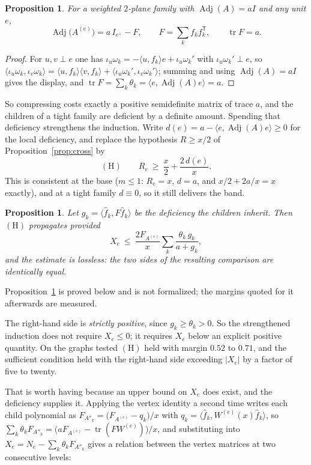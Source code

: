 \documentclass[11pt]{article}
\newtheorem{proposition}[theorem]{Proposition}
\theoremstyle{remark}
\begin{document}
\begin{proposition}\label{prop:deficient}
For a weighted $2$-plane family with $\operatorname{Adj}(A)=aI$ and any unit $e$,
\[
\operatorname{Adj}\bigl(A^{(e)}\bigr)=a\,I_{e^\perp}-F,\qquad F=\sum_kf_kf_k^{\mathsf T},
\qquad \operatorname{tr}F=a .
\]
\end{proposition}

\begin{proof}
For $u,v\perp e$ one has $\iota_u\omega_k=-\langle u,f_k\rangle e+\iota_u\omega_k'$ with
$\iota_u\omega_k'\perp e$, so
$\langle\iota_u\omega_k,\iota_v\omega_k\rangle
=\langle u,f_k\rangle\langle v,f_k\rangle+\langle\iota_u\omega_k',\iota_v\omega_k'\rangle$;
summing and using $\operatorname{Adj}(A)=aI$ gives the display, and
$\operatorname{tr}F=\sum_k\theta_k=\langle e,\operatorname{Adj}(A)e\rangle=a$.
\end{proof}

So compressing costs exactly a positive semidefinite matrix of trace $a$, and the children
of a tight family are deficient by a definite amount. Spending that deficiency strengthens
the induction. Write $d(e)=a-\langle e,\operatorname{Adj}(A)e\rangle\ge0$ for the local
deficiency, and replace the hypothesis $R\ge x/2$ of Proposition~\ref{prop:cross} by
\[
(\mathrm H)\qquad R_e\ \ge\ \frac x2+\frac{2\,d(e)}{x}.
\]
This is consistent at the base ($m\le1$: $R_e=x$, $d=a$, and $x/2+2a/x=x$ exactly), and at
a tight family $d\equiv0$, so it still delivers the band.

\begin{proposition}\label{prop:defstep}
Let $g_k=\langle\hat f_k,F\hat f_k\rangle$ be the deficiency the children inherit. Then
$(\mathrm H)$ propagates provided
\[
X_e\ \le\ \frac{2F_{A^{(e)}}}{x}\sum_k\frac{\theta_k\,g_k}{a+g_k},
\]
and the estimate is lossless: the two sides of the resulting comparison are identically
equal.
\end{proposition}

Proposition~\ref{prop:defstep} is proved below and is not formalized; the margins quoted for it
afterwards are measured.

The right-hand side is \emph{strictly positive}, since $g_k\ge\theta_k>0$. So the
strengthened induction does not require $X_e\le0$; it requires $X_e$ below an explicit
positive quantity. On the graphs tested $(\mathrm H)$ held with margin $0.52$ to $0.71$,
and the sufficient condition held with the right-hand side exceeding $|X_e|$ by a factor
of five to twenty.

That is worth having because an upper bound on $X_e$ does exist, and the deficiency
supplies it. Applying the vertex identity a second time writes each child polynomial as
$F_{A''_k}=\bigl(F_{A^{(e)}}-q_k\bigr)/x$ with
$q_k=\langle\hat f_k,W^{(e)}(x)\hat f_k\rangle$, so
$\sum_k\theta_kF_{A''_k}=\bigl(aF_{A^{(e)}}-\operatorname{tr}(FW^{(e)})\bigr)/x$, and
substituting into $X_e=N_e-\sum_k\theta_kF_{A''_k}$ gives a relation between the vertex
matrices at two consecutive levels:
\end{document}
